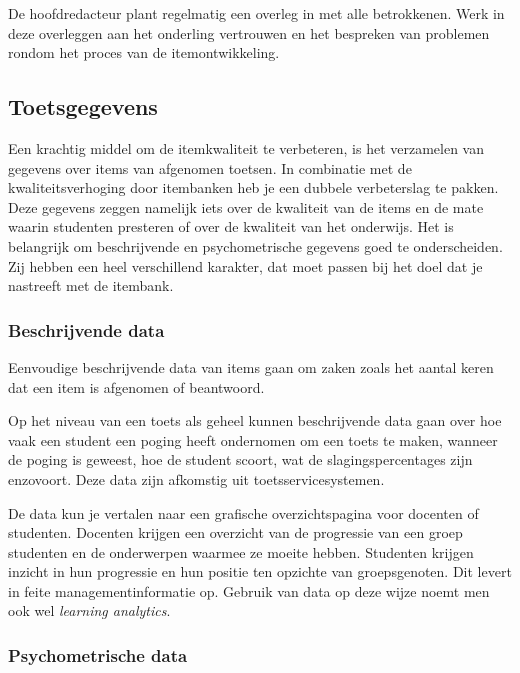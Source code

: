 \documentclass[
]{book}
\begin{document}
De hoofdredacteur plant regelmatig een overleg in met alle betrokkenen. Werk in deze overleggen aan het onderling vertrouwen en het bespreken van problemen rondom het proces van de itemontwikkeling.

\hypertarget{toetsgegevens}{%
\subsection{Toetsgegevens}\label{toetsgegevens}}

Een krachtig middel om de itemkwaliteit te verbeteren, is het verzamelen van gegevens over items van afgenomen toetsen. In combinatie met de kwaliteitsverhoging door itembanken heb je een dubbele verbeterslag te pakken. Deze gegevens zeggen namelijk iets over de kwaliteit van de items en de mate waarin studenten presteren of over de kwaliteit van het onderwijs. Het is belangrijk om beschrijvende en psychometrische gegevens goed te onderscheiden. Zij hebben een heel verschillend karakter, dat moet passen bij het doel dat je nastreeft met de itembank.

\hypertarget{beschrijvende-data}{%
\subsubsection{Beschrijvende data}\label{beschrijvende-data}}

Eenvoudige beschrijvende data van items gaan om zaken zoals het aantal keren dat een item is afgenomen of beantwoord.

Op het niveau van een toets als geheel kunnen beschrijvende data gaan over hoe vaak een student een poging heeft ondernomen om een toets te maken, wanneer de poging is geweest, hoe de student scoort, wat de slagingspercentages zijn enzovoort. Deze data zijn afkomstig uit toetsservicesystemen.

De data kun je vertalen naar een grafische overzichtspagina voor docenten of studenten. Docenten krijgen een overzicht van de progressie van een groep studenten en de onderwerpen waarmee ze moeite hebben. Studenten krijgen inzicht in hun progressie en hun positie ten opzichte van groepsgenoten. Dit levert in feite managementinformatie op. Gebruik van data op deze wijze noemt men ook wel \emph{learning analytics}.

\hypertarget{psychometrische-data}{%
\subsubsection{Psychometrische data}\label{psychometrische-data}}
\end{document}
